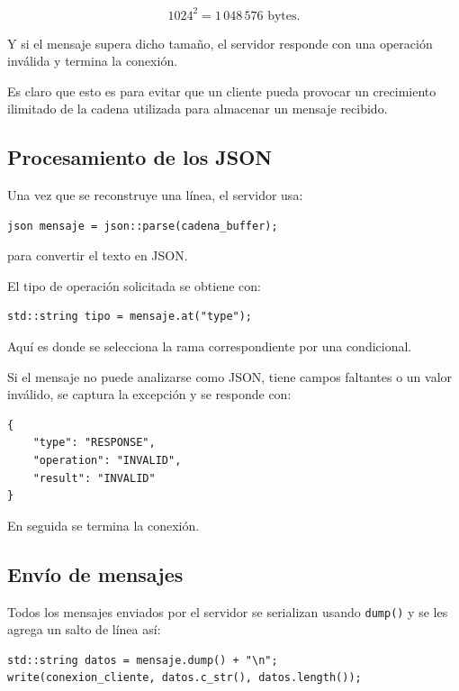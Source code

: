 \documentclass[12pt,letterpaper]{article}
\begin{document}
\[
1024^2 = 1\,048\,576\text{ bytes}.
\]

Y si el mensaje supera dicho tamaño, el servidor responde con una operación
inválida y termina la conexión.

Es claro que esto es para evitar que un cliente pueda provocar un crecimiento ilimitado de la cadena utilizada para almacenar un mensaje recibido.

\subsection{Procesamiento de los JSON}

Una vez que se reconstruye una línea, el servidor usa:

\begin{lstlisting}[style=cppstyle]
json mensaje = json::parse(cadena_buffer);
\end{lstlisting}

para convertir el texto en JSON.

El tipo de operación solicitada se obtiene con:

\begin{lstlisting}[style=cppstyle]
std::string tipo = mensaje.at("type");
\end{lstlisting}

Aquí es donde se selecciona la rama correspondiente por una condicional.

Si el mensaje no puede analizarse como JSON, tiene campos faltantes o un valor inválido, se captura la excepción y se responde con:

\begin{lstlisting}[style=jsonstyle]
{
    "type": "RESPONSE",
    "operation": "INVALID",
    "result": "INVALID"
}
\end{lstlisting}

En seguida se termina la conexión.

\subsection{Envío de mensajes}

Todos los mensajes enviados por el servidor se serializan usando \texttt{dump()} y se les agrega un salto de línea así:

\begin{lstlisting}[style=cppstyle]
std::string datos = mensaje.dump() + "\n";
write(conexion_cliente, datos.c_str(), datos.length());
\end{lstlisting}
\end{document}
